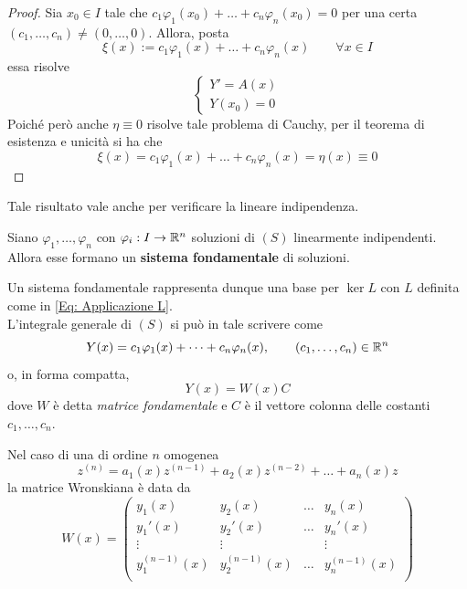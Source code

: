 \begin{proof}
   Sia $x_0 \in I$ tale che $c_1 \varphi_1(x_0)+ \dots+c_n \varphi_n(x_0) = 0$ per una certa $(c_1, \dots, c_n) \neq (0, \dots, 0)$.
   Allora, posta
   \begin{equation*}
       \xi(x):=c_1 \varphi_1(x)+ \dots
        +c_n \varphi_n(x) \qquad \forall x \in I
   \end{equation*}
   essa risolve 
   \begin{equation*}
       \begin{cases}
           Y'=A(x)\\
           Y(x_0)=0
       \end{cases}
   \end{equation*}
   Poiché però anche $\eta\equiv 0$ risolve tale problema di Cauchy, per il teorema di esistenza e unicità si ha che 
   \begin{equation*}
       \xi(x)=c_1 \varphi_1(x)+ \dots
        +c_n \varphi_n(x) =\eta(x) \equiv0
   \end{equation*}
\end{proof}
Tale risultato vale anche per verificare la lineare indipendenza.
\begin{definition}
    Siano $\varphi_1, \dots, \varphi_n$ con $\varphi_i:I \to \mathbb{R}^n$ 
    soluzioni di $(S)$ linearmente indipendenti. Allora esse formano un \textbf{sistema fondamentale} di soluzioni.
\end{definition}
Un sistema fondamentale rappresenta dunque una base per $\ker L$ con $L$ definita come in \eqref{Eq: Applicazione L}.\\
L'integrale generale di $(S)$ si può in tale scrivere come 
\begin{equation*}
    Y(x)= c_1\varphi_1(x)+ \dots+ c_n\varphi_n(x), \qquad (c_1, \dots, c_n) \in \mathbb{R}^n
\end{equation*}
o, in forma compatta, 
\begin{equation*}
    Y(x)=W(x)C
\end{equation*}
dove $W$ è detta \textit{matrice fondamentale} e $C$ è il vettore colonna delle costanti $c_1, \dots, c_n$.\\
\begin{oss}
    Nel caso di una \ode di ordine $n$ omogenea
    \begin{equation*}
        z^{(n)}=a_1(x)z^{(n-1)}+ a_2(x)z^{(n-2)}+ \dots + a_n(x)z
    \end{equation*}
    la matrice Wronskiana è data da
    \begin{equation*}
        W(x)=\begin{pmatrix}
            y_1(x) & y_2(x) & \dots & y_n(x)\\
            y_1'(x) & y_2'(x) & \dots & y_n'(x)\\
            \vdots & \vdots & \, & \vdots\\
            y_1^{(n-1)}(x) & y_2^{(n-1)}(x) & \dots & y_n^{(n-1)}(x)\\
        \end{pmatrix}
    \end{equation*}
\end{oss}
